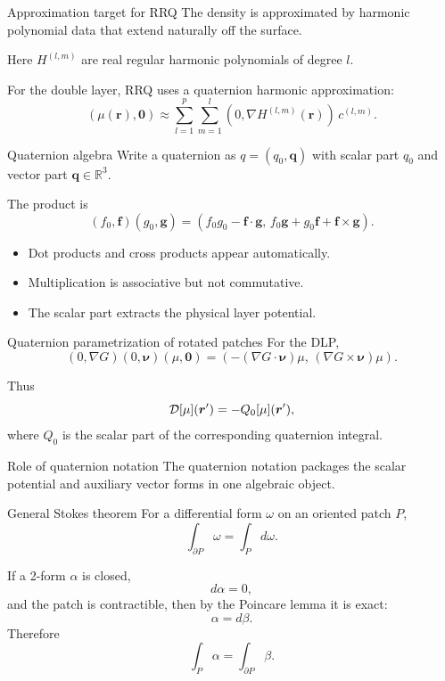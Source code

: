 \documentclass[aspectratio=169,11pt]{beamer}
\newcommand{\R}{\mathbb{R}}
\newcommand{\rvec}{\bm{r}}
\newcommand{\rp}{\bm{r}'}
\newcommand{\nuvec}{\bm{\nu}}
\begin{document}
\begin{frame}{Approximation target for RRQ}
\small
The density is approximated by harmonic polynomial data that extend naturally
off the surface.

Here $H^{(l,m)}$ are real regular harmonic polynomials of degree $l$.

For the double layer, RRQ uses a quaternion harmonic approximation:
\[
  (\mu(\rvec),\bm 0)
  \approx
  \sum_{l=1}^p\sum_{m=1}^l
  (0,\nabla H^{(l,m)}(\rvec))\,c^{(l,m)}.
\]

\end{frame}

\begin{frame}{Quaternion algebra}
\small
Write a quaternion as $q=(q_0,\bm q)$ with scalar part $q_0$ and vector part
$\bm q\in\R^3$.

The product is
\[
  (f_0,\bm f)(g_0,\bm g)
  =
  (f_0g_0-\bm f\cdot\bm g,\,
   f_0\bm g+g_0\bm f+\bm f\times\bm g).
\]

\begin{itemize}
  \item Dot products and cross products appear automatically.
  \item Multiplication is associative but not commutative.
  \item The scalar part extracts the physical layer potential.
\end{itemize}
\end{frame}

\begin{frame}{Quaternion parametrization of rotated patches}
\small
For the DLP,
\[
  (0,\nabla G)(0,\nuvec)(\mu,\bm0)
  =
  \left(
  -(\nabla G\cdot\nuvec)\mu,\,
  (\nabla G\times\nuvec)\mu
  \right).
\]

Thus
\[
  \Dop[\mu](\rp)=-Q_0[\mu](\rp),
\]
where $Q_0$ is the scalar part of the corresponding quaternion integral.

\begin{block}{Role of quaternion notation}
The quaternion notation packages the scalar potential and auxiliary vector
forms in one algebraic object.
\end{block}
\end{frame}

\begin{frame}{General Stokes theorem}
\small
For a differential form $\omega$ on an oriented patch $P$,
\[
  \int_{\partial P}\omega=\int_P d\omega.
\]

If a 2-form $\alpha$ is closed,
\[
  d\alpha=0,
\]
and the patch is contractible, then by the Poincare lemma it is exact:
\[
  \alpha=d\beta.
\]
Therefore
\[
  \int_P \alpha=\int_{\partial P}\beta.
\]
\end{frame}
\end{document}
